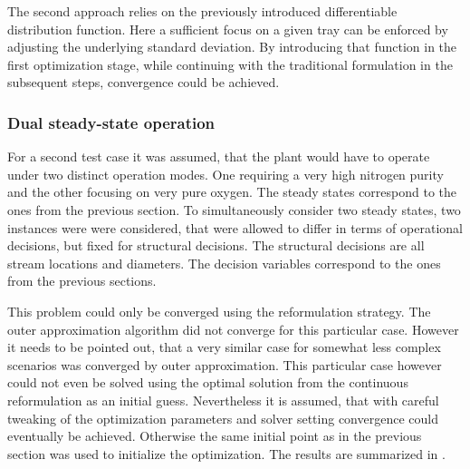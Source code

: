     The second approach relies on the previously introduced differentiable distribution function. Here a sufficient
    focus on a given tray can be enforced by adjusting the underlying standard deviation. By introducing that function
    in the first optimization stage, while continuing with the traditional formulation in the subsequent steps,
    convergence could be achieved.


    \subsubsection{Dual steady-state operation}
    For a second test case it was assumed, that the plant would have to operate under two distinct
    operation modes. One requiring a very high nitrogen purity and the other focusing on very pure oxygen.
    The steady states correspond to the ones from the previous section. To simultaneously consider two steady
    states, two instances were were considered, that were allowed to differ in terms of operational decisions,
    but fixed for structural decisions. The structural decisions are all stream locations and diameters.
    The decision variables correspond to the ones from the previous sections.

    This problem could only be converged using the reformulation strategy. The outer approximation algorithm
    did not converge for this particular case. However it needs to be pointed out, that a very similar case
    for somewhat less complex scenarios was converged by outer approximation. This particular case however could
    not even be solved using the optimal solution from the continuous reformulation as an initial guess.
    Nevertheless it is assumed, that with careful tweaking of the optimization parameters and solver setting
    convergence could eventually be achieved.
    Otherwise the same initial point as in the previous section was used to initialize the optimization.
    The results are summarized in .

